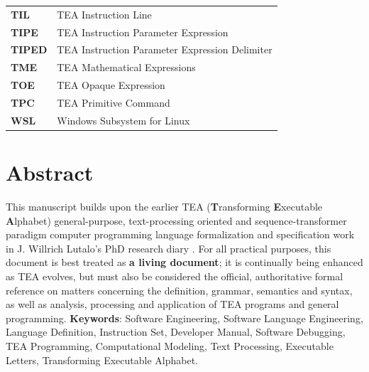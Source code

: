 \documentclass[a4paper, 18pt]{book} %
\begin{document}
\begin{longtable}{p{3cm} p{12cm}}
\textbf{TIL} & TEA Instruction Line\\

\textbf{TIPE} & TEA Instruction Parameter Expression\\

\textbf{TIPED} & TEA Instruction Parameter Expression Delimiter\\

\textbf{TME} & TEA Mathematical Expressions\\

\textbf{TOE} & TEA Opaque Expression\\

\textbf{TPC} & TEA Primitive Command\\

\textbf{WSL} & Windows Subsystem for Linux\\




\end{longtable}





\mainmatter

\chapter*{Abstract}

{
\Large

This manuscript builds upon the earlier TEA (\textbf{T}ransforming \textbf{E}xecutable \textbf{A}lphabet) general-purpose, text-processing oriented and sequence-transformer paradigm computer programming language formalization and specification work in J. Willrich Lutalo's PhD research diary \cite{lutalo2024tea}. For all practical purposes, this document is best treated as \textbf{a living document}; it is continually being enhanced as TEA evolves, but must also be considered the official, authoritative formal reference on matters concerning the definition, grammar, semantics and syntax, as well as analysis, processing and application of TEA programs and general programming. 
     \newline\newline
     \textbf{Keywords}: Software Engineering, Software Language Engineering, Language Definition, Instruction Set, Developer Manual, Software Debugging, TEA Programming, Computational Modeling, Text Processing, Executable Letters, Transforming Executable Alphabet.
}
\end{document}
